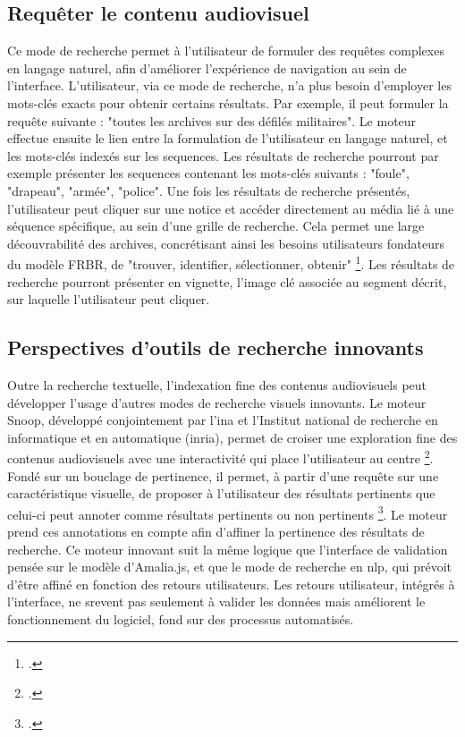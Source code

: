 \subsection{Requêter le contenu audiovisuel}
Ce mode de recherche permet à l'utilisateur de formuler des requêtes complexes en langage naturel, afin d'améliorer l'expérience de navigation au sein de l'interface. L'utilisateur, via ce mode de recherche, n'a plus besoin d'employer les mots-clés exacts pour obtenir certains résultats. Par exemple, il peut formuler la requête suivante : "toutes les archives sur des défilés militaires". Le moteur effectue ensuite le lien entre la formulation de l'utilisateur en langage naturel, et les mots-clés indexés sur les \gls{sequence}s. Les résultats de recherche pourront par exemple présenter les \gls{sequence}s contenant les mots-clés suivants : "foule", "drapeau", "armée", "police". Une fois les résultats de recherche présentés, l'utilisateur peut cliquer sur une notice et accéder directement au média lié à une séquence spécifique, au sein d'une grille de recherche. Cela permet une large découvrabilité des archives, concrétisant ainsi les besoins utilisateurs fondateurs du modèle \gls{FRBR}, de "trouver, identifier, sélectionner, obtenir" \footcite{zotero-item-653}. 
Les résultats de recherche pourront présenter en vignette, l’image clé associée au segment décrit, sur laquelle l’utilisateur peut cliquer. 

\subsection{Perspectives d'outils de recherche innovants}

Outre la recherche textuelle, l'indexation fine des contenus audiovisuels peut développer l'usage d'autres modes de recherche visuels innovants. Le moteur Snoop, développé conjointement par l'\gls{ina} et l'Institut national de recherche en informatique et en
automatique (\gls{inria}), permet de croiser une exploration fine des contenus audiovisuels avec une interactivité qui place l'utilisateur au centre \footcite{zotero-item-744}. Fondé sur un bouclage de pertinence, il permet, à partir d'une requête sur une caractéristique visuelle, de proposer à l'utilisateur des résultats pertinents que celui-ci peut annoter comme résultats pertinents ou non pertinents \footcite{zotero-item-796}. Le moteur prend ces annotations en compte afin d'affiner la pertinence des résultats de recherche.
Ce moteur innovant suit la même logique que l'interface de validation pensée sur le modèle d'Amalia.js, et que le mode de recherche en \gls{nlp}, qui prévoit d'être affiné en fonction des retours utilisateurs. Les retours utilisateur, intégrés à l'interface, ne srevent pas seulement à valider les données mais améliorent le fonctionnement du logiciel, fond sur des processus automatisés. 

